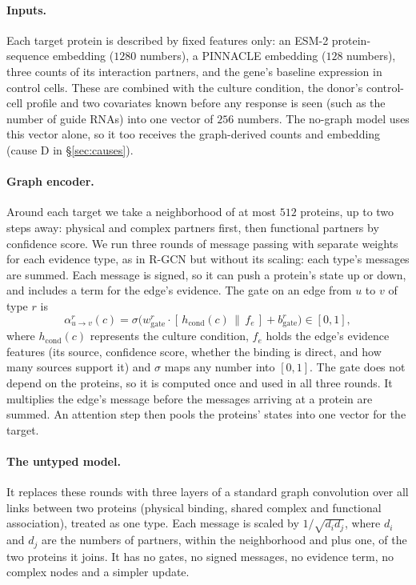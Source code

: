 \documentclass{article}
\begin{document}
\paragraph{Inputs.} Each target protein is described by fixed features only: an ESM-2 protein-sequence
embedding \citep{lin2023esm2} ($1280$ numbers), a PINNACLE embedding \citep{li2024pinnacle} ($128$
numbers), three counts of its interaction partners, and the gene's baseline expression in control cells.
These are combined with the culture condition, the donor's control-cell profile and two covariates known
before any response is seen (such as the number of guide RNAs) into one vector of $256$ numbers. The
no-graph model uses this vector alone, so it too receives the graph-derived counts and embedding (cause D
in \S\ref{sec:causes}).

\paragraph{Graph encoder.} Around each target we take a neighborhood of at most $512$ proteins, up to two
steps away: physical and complex partners first, then functional partners by confidence score. We run
three rounds of message passing with separate weights for each evidence type, as in R-GCN
\citep{schlichtkrull2018rgcn} but without its scaling: each type's messages are summed. Each message is
signed, so it can push a protein's state up or down, and includes a term for the edge's evidence. The gate
on an edge from $u$ to $v$ of type $r$ is
\begin{equation}
\alpha_{u\to v}^{r}(c)=\sigma\!\big(w_{\mathrm{gate}}^{r}\cdot[\,h_{\mathrm{cond}}(c)\,\|\,f_e\,]+b_{\mathrm{gate}}^{r}\big)\in[0,1],
\label{eq:gate}
\end{equation}
where $h_{\mathrm{cond}}(c)$ represents the culture condition, $f_e$ holds the edge's evidence features
(its source, confidence score, whether the binding is direct, and how many sources support it) and
$\sigma$ maps any number into $[0,1]$. The gate does not depend on the proteins, so it is computed once and
used in all three rounds. It multiplies the edge's message before the messages arriving at a protein are
summed. An attention step then pools the proteins' states into one vector for the target.

\paragraph{The untyped model.} It replaces these rounds with three layers of a standard graph convolution
\citep{kipf2017gcn} over all links between two proteins (physical binding, shared complex and
functional association), treated as one type. Each message is scaled by $1/\sqrt{d_i d_j}$, where $d_i$
and $d_j$ are the numbers of partners, within the neighborhood and plus one, of the two proteins it
joins. It has
no gates, no signed messages, no evidence term, no complex nodes and a simpler update.
\end{document}
